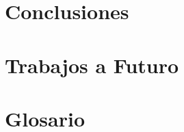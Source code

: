 \documentclass[12pt,twoside]{book}
\begin{document}
%



\chapter{Conclusiones}
    \label{capConc}



\chapter{Trabajos a Futuro}
    


\appendix
\chapter{Glosario}





%
\end{document}

